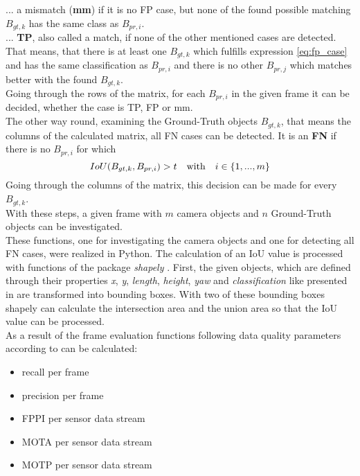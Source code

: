 ... a mismatch (\textbf{mm}) if it is no FP case, but none of the found possible matching $B_{gt,k}$ has the same class as $B_{pr,i}$. \\

... \textbf{TP}, also called a match, if none of the other mentioned cases are detected. That means, that there is at least one $B_{gt,k}$ which fulfills expression \cref{eq:fp_case} and has the same classification as $B_{pr,i}$ and there is no other $B_{pr,j}$ which matches better with the found $B_{gt,k}$. \\

Going through the rows of the matrix, for each $B_{pr,i}$ in the given frame it can be decided, whether the case is TP, FP or mm. \\

The other way round, examining the Ground-Truth objects $B_{gt,k}$, that means the columns of the calculated matrix, all FN cases can be detected. It is an \textbf{FN} if there is no $B_{pr,i}$ for which
\begin{equation}
	IoU(B_{gt,k}, B_{pr,i}) > t \text{\quad with\quad} i \in \left\lbrace 1, ..., m\right\rbrace 
	\label{eq:fn_case}
\end{equation}
Going through the columns of the matrix, this decision can be made for every $B_{gt,k}$. \\
With these steps, a given frame with $m$ camera objects and $n$ Ground-Truth objects can be investigated. \\

These functions, one for investigating the camera objects and one for detecting all FN cases, were realized in Python. The calculation of an IoU value is processed with functions of the package \textit{shapely} \cite{Shapely}.
First, the given objects, which are defined through their properties \textit{x}, \textit{y}, \textit{length}, \textit{height}, \textit{yaw} and \textit{classification} like presented in \cite{Aeberhard}
are transformed into bounding boxes. With two of these bounding boxes shapely can calculate the intersection area and the union area so that the IoU value can be processed. \\

As a result of the frame evaluation functions following data quality parameters according to \cite{Reway} can be calculated:
\begin{itemize}
	
	\item recall per frame
	\item precision per frame
	\item FPPI per sensor data stream 
	\item MOTA per sensor data stream 
	\item MOTP per sensor data stream 
	
\end{itemize}

